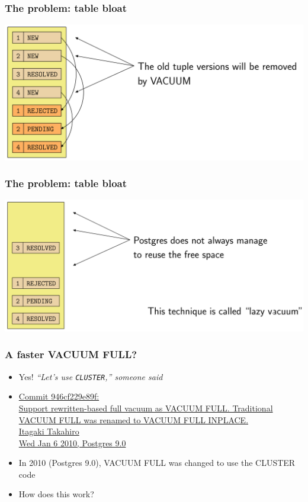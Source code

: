 \begin{frame}
  \frametitle{The problem: table bloat}
  \includegraphics[height=\sizeforimages\textheight]{images/bloat_01.png}
\end{frame}

\begin{frame}
  \frametitle{The problem: table bloat}
  \includegraphics[height=\sizeforimages\textheight]{images/bloat_02.png}
\end{frame}

\begin{frame}
  \frametitle{A faster VACUUM FULL?}
  \begin{itemize}

    \item Yes! \emph{``Let's use \texttt{CLUSTER},'' someone said}
    \item {\linksize \href{https://git.postgresql.org/cgit/postgresql.git/commit/?id=946cf229e89fda779161d707f3ba1f4d3cd024a1}
      {Commit 946cf229e89f: \faExternalLink \\
      Support rewritten-based full vacuum as VACUUM FULL. Traditional VACUUM FULL was renamed to VACUUM FULL INPLACE. \\
      Itagaki Takahiro \\
      Wed Jan 6 2010, Postgres 9.0}}

    \item In 2010 (Postgres 9.0), VACUUM FULL was changed to use the CLUSTER code
    \item How does this work?
  \end{itemize}
\end{frame}

